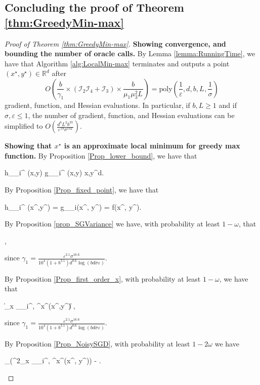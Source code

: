 \documentclass[11pt,letterpaper]{article}
\renewcommand{\epsilon}{\varepsilon}
\def \be{\begin{equs}}
\def \ee{\end{equs}}
\newcommand{\ai}{i}
\begin{document}
\subsection{Concluding the proof of Theorem \ref{thm:GreedyMin-max}} \label{concluding_the_proof}

\begin{proof}[Proof of Theorem \ref{thm:GreedyMin-max}]
%
\textbf{Showing convergence, and bounding the number of oracle calls.}
%
By Lemma \ref{lemma:RunningTime}, we have that Algorithm \ref{alg:LocalMin-max} terminates and outputs a point $(x^\star, y^\star) \in \mathbb{R}^d$ after  $$O\left(\frac{b}{\gamma_1} \times (\mathcal{I}_2 \mathcal{I}_4 + \mathcal{I}_3) \times \frac{b}{ \mu_1 \mu_3^2 L_{}}\right) = \mathrm{poly}\left(\frac{1}{\epsilon}, d, b, L_{}, \frac{1}{\sigma}\right)$$ gradient, function, and Hessian evaluations.  In particular, if $b, L \geq 1$ and if $\sigma, \epsilon \leq 1$, the number of gradient, function, and Hessian evaluations can be simplified to $O\left(\frac{d^{8} L^2 b^{37}}{\epsilon^{19}\sigma^{132}}\right)$.

\bigskip
\noindent
\textbf{Showing that $x^\star$ is an approximate local minimum for greedy max function.}
%
By Proposition \ref{Prop_lower_bound}, we have that
\be \label{eq:h7}
h_{\epsilon_{\ai^\star}} (x,y) \leq g_{\epsilon_{\ai^\star}} (x,y)  \qquad \forall x,y\in {}^d.
\ee

\noindent By Proposition \ref{Prop_fixed_point}, we have that
\be \label{eq:h1}
  h_{\epsilon_{\ai^\star}} (x^\star,y^\star) = g_{\epsilon_i}(x^\star, y^\star) = f(x^\star, y^\star).
\ee

\noindent By Proposition \ref{prop_SGVariance} we have, with probability at least $1-\omega$, that
%
\be \label{eq:h3}
\left[\left\|\mathcal{H}^{x^\star}_{\epsilon_{\ai^\star}}(x^\star, y^\star)\right\| \big | (x^\star, y^\star) \right]  \leq  {}  \frac{\sigma^{14} \epsilon_{\ai^\star}^{1.5}}{b^2},
\ee
since $\gamma_1 = \frac{\epsilon^{2.1} \sigma^{16.6}}{10^4 (1+b^{3.1}) d^{0.6} \log(b d \sigma \epsilon)}$.

 \noindent
By Proposition \ref{Prop_first_order_x}, with probability at least $1-\omega$, we have that
\be \label{eq:h8}
\left\| \nabla_{{x}} _{\epsilon_{\ai^\star}, \sigma}^{x^\star}(x^\star,y^\star)\right\| \leq \frac{\epsilon_{\ai^\star}^2}{8000}  ,
\ee
since $\gamma_1 = \frac{\epsilon^{2.1} \sigma^{16.6}}{10^4 (1+b^{3.1}) d^{0.6} \log(b d \sigma \epsilon)}$.

 \noindent
By Proposition \ref{Prop_NoisySGD}, with probability at least $1-2\omega$ we have
%
\be \label{eq:h4}
 \lambda_{}(\nabla^2_{{x}} _{\epsilon_{\ai^\star}, \sigma}^{x^\star}(x^\star, y^\star)) \geq - \sqrt{\epsilon_{\ai^\star}}.
 \ee
 

\end{proof}
\end{document}
